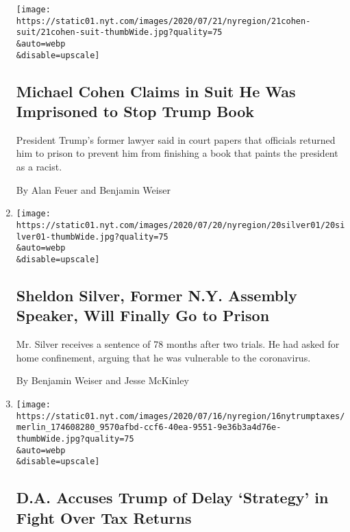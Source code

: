 \begin{enumerate}
  \texttt{[image: https://static01.nyt.com/images/2020/07/21/nyregion/21cohen-suit/21cohen-suit-thumbWide.jpg?quality=75\\\&auto=webp\\\&disable=upscale]}

  \hypertarget{michael-cohen-claims-in-suit-he-was-imprisoned-to-stop-trump-book}{%
  \subsection{Michael Cohen Claims in Suit He Was Imprisoned to Stop
  Trump
  Book}\label{michael-cohen-claims-in-suit-he-was-imprisoned-to-stop-trump-book}}

  President Trump's former lawyer said in court papers that officials
  returned him to prison to prevent him from finishing a book that
  paints the president as a racist.

  By Alan Feuer and Benjamin Weiser
\item
  \href{/2020/07/20/nyregion/sheldon-silver-sentencing-prison.html}{}

  \texttt{[image: https://static01.nyt.com/images/2020/07/20/nyregion/20silver01/20silver01-thumbWide.jpg?quality=75\\\&auto=webp\\\&disable=upscale]}

  \hypertarget{sheldon-silver-former-ny-assembly-speaker-will-finally-go-to-prison}{%
  \subsection{Sheldon Silver, Former N.Y. Assembly Speaker, Will Finally
  Go to
  Prison}\label{sheldon-silver-former-ny-assembly-speaker-will-finally-go-to-prison}}

  Mr. Silver receives a sentence of 78 months after two trials. He had
  asked for home confinement, arguing that he was vulnerable to the
  coronavirus.

  By Benjamin Weiser and Jesse McKinley
\item
  \href{/2020/07/16/nyregion/donald-trump-taxes-cyrus-vance.html}{}

  \texttt{[image: https://static01.nyt.com/images/2020/07/16/nyregion/16nytrumptaxes/merlin\_174608280\_9570afbd-ccf6-40ea-9551-9e36b3a4d76e-thumbWide.jpg?quality=75\\\&auto=webp\\\&disable=upscale]}

  \hypertarget{da-accuses-trump-of-delay-strategy-in-fight-over-tax-returns}{%
  \subsection{D.A. Accuses Trump of Delay `Strategy' in Fight Over Tax
  Returns}\label{da-accuses-trump-of-delay-strategy-in-fight-over-tax-returns}}


\end{enumerate}
